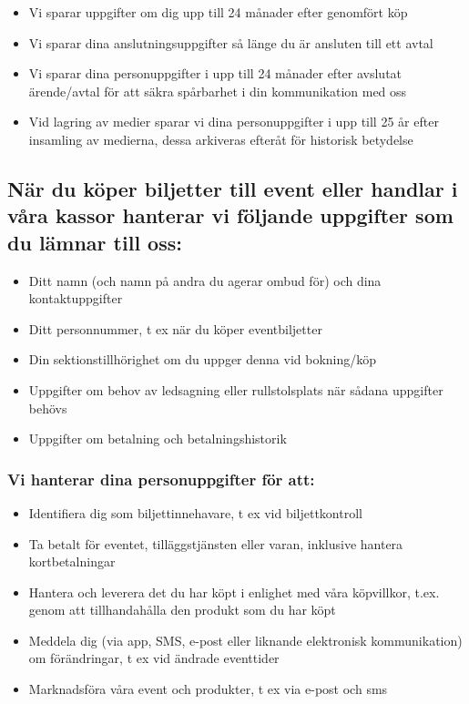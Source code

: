 \documentclass[a4paper]{article}
\begin{document}
  \begin{itemize}
    \item Vi sparar uppgifter om dig upp till 24 månader efter genomfört köp
    \item Vi sparar dina anslutningsuppgifter så länge du är ansluten till ett avtal
    \item Vi sparar dina personuppgifter i upp till 24 månader efter avslutat ärende/avtal för att säkra
      spårbarhet i din kommunikation med oss
    \item Vid lagring av medier sparar vi dina personuppgifter i upp till 25 år efter insamling av medierna, dessa arkiveras efteråt för historisk betydelse
  \end{itemize}



\subsection{När du köper biljetter till event eller handlar i våra kassor hanterar vi följande uppgifter som du lämnar till oss:}

\begin{itemize}
    \item Ditt namn (och namn på andra du agerar ombud för) och dina kontaktuppgifter
    \item Ditt personnummer, t ex när du köper eventbiljetter
    \item Din sektionstillhörighet om du uppger denna vid bokning/köp
    \item Uppgifter om behov av ledsagning eller rullstolsplats när sådana uppgifter
    behövs
    \item Uppgifter om betalning och betalningshistorik
\end{itemize}
\subsubsection{Vi hanterar dina personuppgifter för att:}
\begin{itemize}
    \item Identifiera dig som biljettinnehavare, t ex vid biljettkontroll
    \item Ta betalt för eventet, tilläggstjänsten eller varan, inklusive hantera
    kortbetalningar
    \item Hantera och leverera det du har köpt i enlighet med våra köpvillkor, t.ex. genom
    att tillhandahålla den produkt som du har köpt
    \item Meddela dig (via app, SMS, e-post eller liknande elektronisk kommunikation)
    om förändringar, t ex vid ändrade eventtider
    \item Marknadsföra våra event och produkter, t ex via e-post och sms
\end{itemize}
\end{document}
